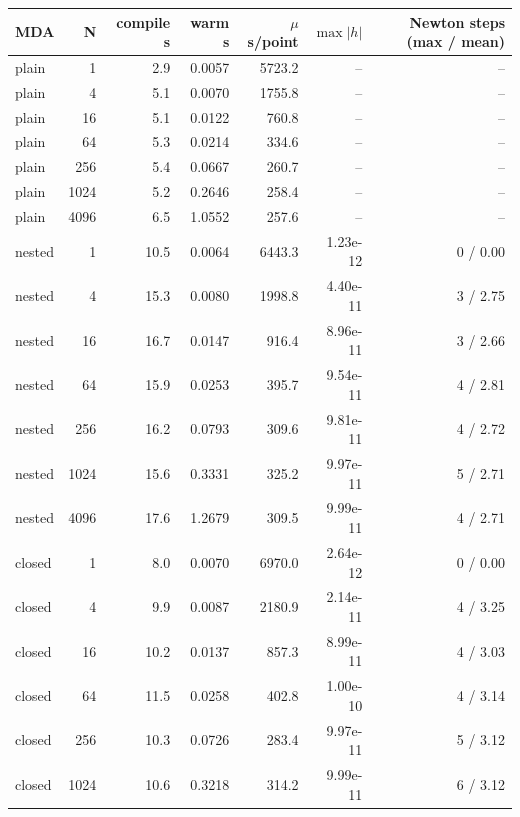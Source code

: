 \begin{tabular}{lrrrrrr}
\toprule
MDA & N & compile s & warm s & $\mu$s/point & $\max|h|$ & Newton steps (max / mean) \\
\midrule
plain & 1 & 2.9 & 0.0057 & 5723.2 & -- & -- \\
plain & 4 & 5.1 & 0.0070 & 1755.8 & -- & -- \\
plain & 16 & 5.1 & 0.0122 & 760.8 & -- & -- \\
plain & 64 & 5.3 & 0.0214 & 334.6 & -- & -- \\
plain & 256 & 5.4 & 0.0667 & 260.7 & -- & -- \\
plain & 1024 & 5.2 & 0.2646 & 258.4 & -- & -- \\
plain & 4096 & 6.5 & 1.0552 & 257.6 & -- & -- \\
nested & 1 & 10.5 & 0.0064 & 6443.3 & 1.23e-12 & 0 / 0.00 \\
nested & 4 & 15.3 & 0.0080 & 1998.8 & 4.40e-11 & 3 / 2.75 \\
nested & 16 & 16.7 & 0.0147 & 916.4 & 8.96e-11 & 3 / 2.66 \\
nested & 64 & 15.9 & 0.0253 & 395.7 & 9.54e-11 & 4 / 2.81 \\
nested & 256 & 16.2 & 0.0793 & 309.6 & 9.81e-11 & 4 / 2.72 \\
nested & 1024 & 15.6 & 0.3331 & 325.2 & 9.97e-11 & 5 / 2.71 \\
nested & 4096 & 17.6 & 1.2679 & 309.5 & 9.99e-11 & 4 / 2.71 \\
closed & 1 & 8.0 & 0.0070 & 6970.0 & 2.64e-12 & 0 / 0.00 \\
closed & 4 & 9.9 & 0.0087 & 2180.9 & 2.14e-11 & 4 / 3.25 \\
closed & 16 & 10.2 & 0.0137 & 857.3 & 8.99e-11 & 4 / 3.03 \\
closed & 64 & 11.5 & 0.0258 & 402.8 & 1.00e-10 & 4 / 3.14 \\
closed & 256 & 10.3 & 0.0726 & 283.4 & 9.97e-11 & 5 / 3.12 \\
closed & 1024 & 10.6 & 0.3218 & 314.2 & 9.99e-11 & 6 / 3.12 \\

\end{tabular}

